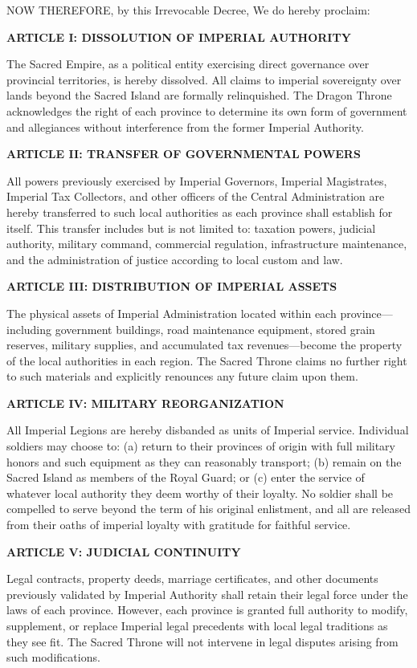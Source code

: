 NOW THEREFORE, by this Irrevocable Decree, We do hereby proclaim:

\textbf{\textbf{ARTICLE I: DISSOLUTION OF IMPERIAL AUTHORITY}}

The Sacred Empire, as a political entity exercising direct governance
over provincial territories, is hereby dissolved. All claims to imperial
sovereignty over lands beyond the Sacred Island are formally
relinquished. The Dragon Throne acknowledges the right of each province
to determine its own form of government and allegiances without
interference from the former Imperial Authority.

\textbf{\textbf{ARTICLE II: TRANSFER OF GOVERNMENTAL POWERS}}

All powers previously exercised by Imperial Governors, Imperial
Magistrates, Imperial Tax Collectors, and other officers of the Central
Administration are hereby transferred to such local authorities as each
province shall establish for itself. This transfer includes but is not
limited to: taxation powers, judicial authority, military command,
commercial regulation, infrastructure maintenance, and the
administration of justice according to local custom and law.

\textbf{\textbf{ARTICLE III: DISTRIBUTION OF IMPERIAL ASSETS}}

The physical assets of Imperial Administration located within each
province---including government buildings, road maintenance equipment,
stored grain reserves, military supplies, and accumulated tax
revenues---become the property of the local authorities in each region.
The Sacred Throne claims no further right to such materials and
explicitly renounces any future claim upon them.

\textbf{\textbf{ARTICLE IV: MILITARY REORGANIZATION}}

All Imperial Legions are hereby disbanded as units of Imperial service.
Individual soldiers may choose to: (a) return to their provinces of
origin with full military honors and such equipment as they can
reasonably transport; (b) remain on the Sacred Island as members of the
Royal Guard; or (c) enter the service of whatever local authority they
deem worthy of their loyalty. No soldier shall be compelled to serve
beyond the term of his original enlistment, and all are released from
their oaths of imperial loyalty with gratitude for faithful service.

\textbf{\textbf{ARTICLE V: JUDICIAL CONTINUITY}}

Legal contracts, property deeds, marriage certificates, and other
documents previously validated by Imperial Authority shall retain their
legal force under the laws of each province. However, each province is
granted full authority to modify, supplement, or replace Imperial legal
precedents with local legal traditions as they see fit. The Sacred
Throne will not intervene in legal disputes arising from such
modifications.

